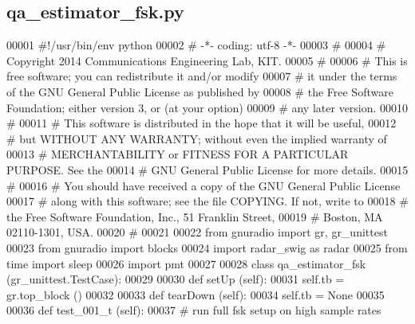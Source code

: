 \subsection{qa\+\_\+estimator\+\_\+fsk.\+py}
\label{qa__estimator__fsk_8py_source}

\begin{DoxyCode}
00001 \textcolor{comment}{#!/usr/bin/env python}
00002 \textcolor{comment}{# -*- coding: utf-8 -*-}
00003 \textcolor{comment}{# }
00004 \textcolor{comment}{# Copyright 2014 Communications Engineering Lab, KIT.}
00005 \textcolor{comment}{# }
00006 \textcolor{comment}{# This is free software; you can redistribute it and/or modify}
00007 \textcolor{comment}{# it under the terms of the GNU General Public License as published by}
00008 \textcolor{comment}{# the Free Software Foundation; either version 3, or (at your option)}
00009 \textcolor{comment}{# any later version.}
00010 \textcolor{comment}{# }
00011 \textcolor{comment}{# This software is distributed in the hope that it will be useful,}
00012 \textcolor{comment}{# but WITHOUT ANY WARRANTY; without even the implied warranty of}
00013 \textcolor{comment}{# MERCHANTABILITY or FITNESS FOR A PARTICULAR PURPOSE.  See the}
00014 \textcolor{comment}{# GNU General Public License for more details.}
00015 \textcolor{comment}{# }
00016 \textcolor{comment}{# You should have received a copy of the GNU General Public License}
00017 \textcolor{comment}{# along with this software; see the file COPYING.  If not, write to}
00018 \textcolor{comment}{# the Free Software Foundation, Inc., 51 Franklin Street,}
00019 \textcolor{comment}{# Boston, MA 02110-1301, USA.}
00020 \textcolor{comment}{# }
00021 
00022 \textcolor{keyword}{from} gnuradio \textcolor{keyword}{import} gr, gr\_unittest
00023 \textcolor{keyword}{from} gnuradio \textcolor{keyword}{import} blocks
00024 \textcolor{keyword}{import} radar\_swig \textcolor{keyword}{as} radar
00025 \textcolor{keyword}{from} time \textcolor{keyword}{import} sleep
00026 \textcolor{keyword}{import} pmt
00027 
00028 \textcolor{keyword}{class }qa_estimator_fsk (gr\_unittest.TestCase):
00029 
00030     \textcolor{keyword}{def }setUp (self):
00031         self.tb = gr.top\_block ()
00032 
00033     \textcolor{keyword}{def }tearDown (self):
00034         self.tb = \textcolor{keywordtype}{None}
00035 
00036     \textcolor{keyword}{def }test_001_t (self):
00037         \textcolor{comment}{# run full fsk setup on high sample rates}

\end{DoxyCode}
